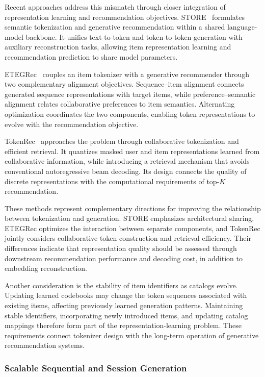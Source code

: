 \documentclass[sigconf,nonacm]{acmart}
\begin{document}
Recent approaches address this mismatch through
closer integration of representation learning and
recommendation objectives. STORE~\cite{store}
formulates semantic tokenization and generative
recommendation within a shared language-model
backbone. It unifies text-to-token and token-to-token
generation with auxiliary reconstruction tasks,
allowing item representation learning and
recommendation prediction to share model parameters.

ETEGRec~\cite{etegrec} couples an item tokenizer
with a generative recommender through two
complementary alignment objectives.
Se\-quence--\allowbreak item alignment connects generated
sequence representations with target items, while
preference--\allowbreak semantic alignment relates collaborative
preferences to item semantics. Alternating optimization
coordinates the two components, enabling token
representations to evolve with the recommendation
objective.

TokenRec~\cite{tokenrec} approaches the problem
through collaborative tokenization and efficient
retrieval. It quantizes masked user and item
representations learned from collaborative information,
while introducing a retrieval mechanism that avoids
conventional autoregressive beam decoding.
Its design connects the quality of discrete
representations with the computational requirements
of top-$K$ recommendation.

These methods represent complementary directions
for improving the relationship between tokenization
and generation. STORE emphasizes architectural
sharing, ETEGRec optimizes the interaction between
separate components, and TokenRec jointly considers
collaborative token construction and retrieval
efficiency. Their differences indicate that
representation quality should be assessed through
downstream recommendation performance and decoding
cost, in addition to embedding reconstruction.

Another consideration is the stability of item
identifiers as catalogs evolve. Updating learned
codebooks may change the token sequences associated
with existing items, affecting previously learned
generation patterns. Maintaining stable identifiers,
incorporating newly introduced items, and updating
catalog mappings therefore form part of the
representation-learning problem. These requirements
connect tokenizer design with the long-term
operation of generative recommendation systems.

\subsubsection{Scalable Sequential and Session Generation}
\end{document}
